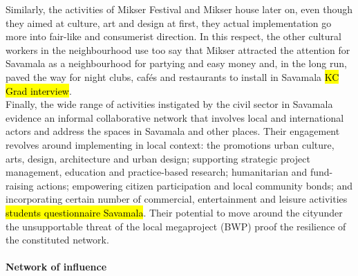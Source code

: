 \documentclass[11pt]{report}
\begin{document}
Similarly, the activities of Mikser Festival and Mikser house later on, even though they aimed at culture, art and design at first, they actual implementation go more into fair-like and consumerist direction. In this respect, the other cultural workers in the neighbourhood use too say that Mikser attracted the attention for Savamala as a neighbourhood for partying and easy money and, in the long run, paved the way for night clubs, cafés and restaurants to install in Savamala
\hl{KC Grad interview}.
\\
Finally, the wide range of activities instigated by the civil sector in Savamala evidence an informal collaborative network that involves local and international actors and address the spaces in Savamala and other places. Their engagement revolves around implementing in local context:
the promotions urban culture, arts, design, architecture and urban design;
supporting strategic project management, education and practice-based research;
humanitarian and fund-raising actions;
empowering citizen participation and local community bonds;
and incorporating certain number of commercial, entertainment and leisure activities
\hl{students questionnaire Savamala}.
Their potential to move around the city\footnotemark under the unsupportable threat of the local megaproject (BWP) proof the resilience of the constituted network.  

\paragraph{Network of influence}
\end{document}
